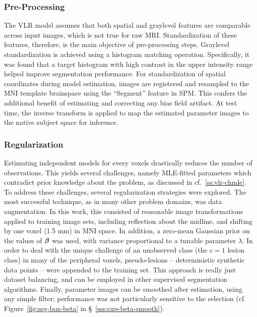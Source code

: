 \subsubsection{Pre-Processing}
The VLR model assumes that both spatial and graylevel features are comparable across input images,
which is not true for raw MRI.
Standardization of these features, therefore, is the main objective of pre-processing steps.
Graylevel standardization is achieved using a histogram matching operation.
Specifically, it was found that a target histogram with high contrast in the upper intensity range
helped improve segmentation performance.
For standardization of spatial coordinates during model estimation,
images are registered and resampled to the MNI template brainspace
using the ``Segment'' feature in SPM.
This confers the additional benefit of estimating and correcting any bias field artifact.
At test time, the inverse transform is applied to map the estimated parameter images
to the native subject space for inference.
\subsubsection{Regularization}
Estimating independent models for every voxels drastically reduces the number of observations.
This yields several challenges, namely MLE-fitted parameters which
contradict prior knowledge about the problem, as discussed in cf.~\ref{ss:vlr-chmle}.
To address these challenges, several regularization strategies were explored.
The most successful technique, as in many other problem domains, was data augmentation.
In this work, this consisted of reasonable image transformations
applied to training image sets, including
reflection about the midline,
and shifting by one voxel (1.5 mm) in MNI space.
In addition, a zero-mean Gaussian prior on the values of $\bm{\beta}$ was used,
with variance proportional to a tunable parameter $\lambda$.
In order to deal with the unique challenge of an unobserved class (the $c=1$ lesion class) 
in many of the peripheral voxels,
pseudo-lesions -- deterministic synthetic data points --
were appended to the training set.
This approach is really just dataset balancing,
and can be employed in other supervised segmentation algorithms.
Finally, parameter images can be smoothed after estimation, using any simple filter;
performance was not particularly sensitive to the selection
(cf. Figure~\ref{fig:seg-box-beta} in \S~\ref{sss:exp-beta-smooth}).
